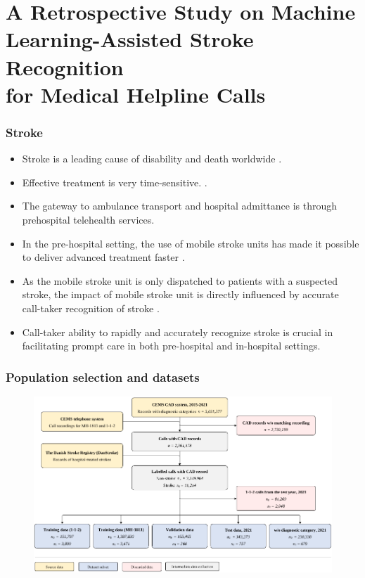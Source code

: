 
\section[A Retrospective Study on Machine Learning-Assisted Stroke Recognition for Medical Helpline Calls]{A Retrospective Study on Machine Learning-Assisted Stroke Recognition\\ for Medical Helpline Calls}


\begin{frame}
    \frametitle{Stroke}
    \begin{itemize}
        \item Stroke is a leading cause of disability and death worldwide \parencite{cite1,cite2,cite3}.
        \item Effective treatment is very time-sensitive. \parencite{cite4,cite5}.
        \item The gateway to ambulance transport and hospital admittance is through prehospital telehealth services.
        \item In the pre-hospital setting, the use of mobile stroke units has made it possible to deliver advanced treatment faster \parencite{cite6,cite7}.
        \item As the mobile stroke unit is only dispatched to patients with a suspected stroke, the impact of mobile stroke unit is directly influenced by accurate call-taker recognition of stroke \parencite{cite6,cite7}.
        \item Call-taker ability to rapidly and accurately recognize stroke is crucial in facilitating prompt care in both pre-hospital and in-hospital settings.
    \end{itemize}
\end{frame}


\begin{frame}
    \frametitle{Population selection and datasets}
    \begin{figure}
        \centering
        \includegraphics[width=0.62\paperwidth]{../graphics/paper_retrospective/data_flowchart.pdf}
    \end{figure}
\end{frame}


